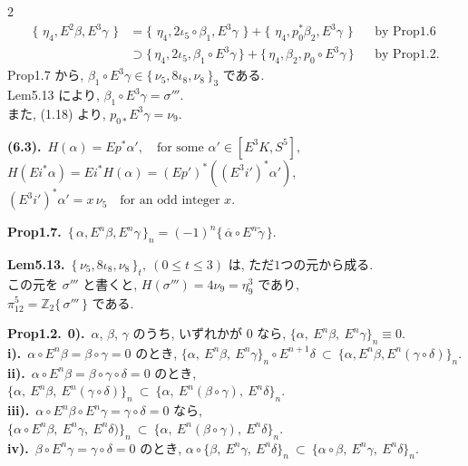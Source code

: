\documentclass[10pt, leqno]{ltjsarticle}
\newcommand{\Ex}{E}        %
\newcommand{\toda}[1]{\{\,#1\,\}}              %
\newcommand{\todai}[2][]{\{\,#2\,\}_{#1}}      %
\newcommand{\gen}[1]{\{\,#1\,\}}       %
\numberwithin{equation}{section}
\theoremstyle{plain}
\theoremstyle{definition}
\theoremstyle{remark}
\begin{document}
\begin{paracol}{2}
\begin{equation}
\begin{align*}
  \toda{\,\eta_{4},E^{2}\beta,E^{3}\gamma\,}
  & = \toda{\,\eta_{4},2\iota_{5}\circ \beta_{1},E^{3}\gamma\,}
  +\toda{\,\eta_{4},p_{0}^{\ast}\beta_{2},E^{3}\gamma\,}
  && \text{by Prop1.6}\\
  & \supset \toda{\eta_4, 2\iota_5, \beta_1\circ E^3\gamma}
  + \toda{\eta_4, \beta_2, p_0\circ E^3\gamma}
  && \text{by Prop1.2} .
\end{align*}
\end{equation}
Prop1.7 から,
\(\beta_{1}\circ E^{3}\gamma\in \todai[3]{\nu_{5},8\iota_{8},\nu_{8}}\) である. \\
Lem5.13 により,
\(\beta_{1}\circ E^{3}\gamma=\sigma''' .\)\\
また, (1.18) より, \(p_{0\ast}E^{3}\gamma=\nu_{9}\). 

\switchcolumn

\noindent
\textbf{(6.3).}\
\(H(\alpha)=E p^{\ast}\alpha',  
\quad \text{for some } \alpha'\in [E^{3}K, S^{5}],\)\\
\(H(Ei^{\ast}\alpha) = Ei^{\ast}H(\alpha) = (Ep')^{\ast}((E^3i')^{\ast}\alpha'),\)\\
\((E^3 i')^{\ast}\alpha' = x\,\nu_{5}\quad \text{for an odd integer }x.\)

\noindent
\textbf{Prop1.7.}\
\(\todai[n]{\alpha, E^n\beta, E^n\gamma}
= (-1)^n\gen{\overline{\alpha}\circ E^n\widetilde{\gamma}}\).

\noindent
\textbf{Lem5.13.}\
\(\todai[t]{\nu_5,8\iota_8,\nu_8},\ (0\leq t\leq3)\) 
は, ただ$1$つの元から成る. \\
この元を \(\sigma'''\) と書くと, 
\(H(\sigma''')=4\nu_9=\eta_9^3\) であり, \\
\(\pi_{12}^5=\mathbb{Z}_2\gen{\sigma'''}\)
である. 

\noindent
\textbf{Prop1.2.}\
\textbf{0).}\ $\alpha$, $\beta$, $\gamma$ のうち, いずれかが $0$ なら,
\(
\{\alpha,\ \Ex^n\beta,\ \Ex^n\gamma\}_n\equiv0.
\)\\
\textbf{i).}\ $\alpha\circ \Ex^n\beta=\beta\circ\gamma=0$ のとき,
\(
\{\alpha,\ \Ex^n\beta,\ \Ex^n\gamma\}_n\circ\Ex^{n+1}\delta\ \subset\ \{\alpha,\Ex^n \beta, \Ex^n(\gamma\circ\delta)\}_n.
\)\\
\textbf{ii).}\ $\alpha\circ \Ex^n\beta=\beta\circ\gamma\circ\delta=0$ のとき,
\(
\{\alpha,\ \Ex^n\beta,\ \Ex^n(\gamma\circ\delta)\}_n\ \subset\ \{\alpha,\ \Ex^n(\beta\circ\gamma),\ \Ex^n\delta\}_n .
\)\\
\textbf{iii).}\ $\alpha\circ\Ex^n\beta\circ\Ex^n\gamma=\gamma\circ\delta=0$ なら,
\(
\{\alpha\circ\Ex^n\beta,\ \Ex^n\gamma,\ \Ex^n\delta)\}_n\ \subset\ \{\alpha,\ \Ex^n(\beta\circ\gamma),\ \Ex^n\delta\}_n .
\)\\
\textbf{iv).}\ $\beta\circ\Ex^n\gamma=\gamma\circ\delta=0$ のとき,
\(
\alpha\circ\{\beta,\ \Ex^n\gamma,\ \Ex^n\delta\}_n\ \subset\ \{\alpha\circ\beta,\ \Ex^n\gamma,\ \Ex^n\delta\}_n .
\)


\end{paracol}
\end{document}
